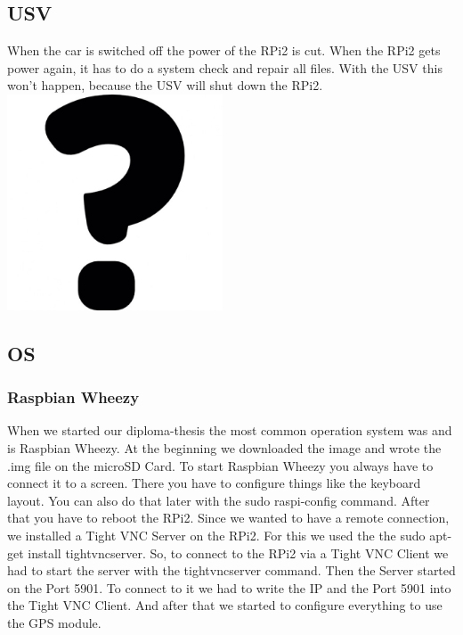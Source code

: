 \subsection{USV}
When the car is switched off the power of the RPi2 is cut. When the RPi2 gets power again, it has to do a system check and repair all files. With the USV this won’t happen, because the USV will shut down the RPi2.\newline
\includegraphics[width=0.48\textwidth]{bilder/USV}
\newpage
\subsection{OS}
\subsubsection{Raspbian Wheezy}
When we started our diploma-thesis the most common operation system was and is Raspbian Wheezy. At the beginning we downloaded the image and wrote the .img file on the microSD Card. To start Raspbian Wheezy you always have to connect it to a screen. There you have to configure things like the keyboard layout. You can also do that later with the sudo raspi-config command. After that you have to reboot the RPi2.
Since we wanted to have a remote connection, we installed a Tight VNC Server on the RPi2. For this we used the the sudo apt-get install tightvncserver. So, to connect to the RPi2 via a Tight VNC Client we had to start the server with the tightvncserver command. Then the Server started on the Port 5901. To connect to it we had to write the IP and the Port 5901 into the Tight VNC Client. And after that we started to configure everything to use the GPS module.

